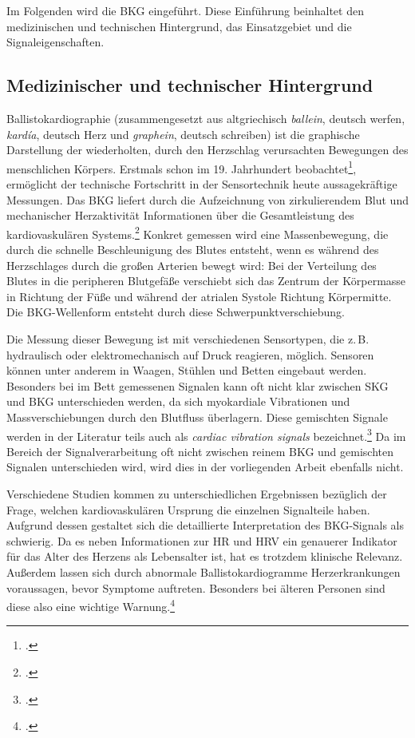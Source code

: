 	Im Folgenden wird die \acl{BKG} eingeführt. Diese Einführung beinhaltet den medizinischen und technischen Hintergrund, das Einsatzgebiet und die Signaleigenschaften.
	
	\subsection{Medizinischer und technischer Hintergrund}
	
	Ballistokardiographie (zusammengesetzt aus altgriechisch \textit{ballein}, deutsch \glq werfen\grq, \textit{kardía}, deutsch \glq Herz\grq{} und \textit{graphein}, deutsch \glq schreiben\grq) ist die graphische Darstellung der wiederholten, durch den Herzschlag verursachten Bewegungen des menschlichen Körpers. Erstmals schon im 19. Jahrhundert beobachtet\footcite[Vgl.][]{Gordon1877}, ermöglicht der technische Fortschritt in der Sensortechnik heute aussagekräftige Messungen. Das \ac{BKG} liefert durch die Aufzeichnung von zirkulierendem Blut und mechanischer Herzaktivität Informationen über die Gesamtleistung des kardiovaskulären Systems.\footcite[Vgl.][]{Pinheiro2010} Konkret gemessen wird eine Massenbewegung, die durch die schnelle Beschleunigung des Blutes entsteht, wenn es während des Herzschlages durch die großen Arterien bewegt wird: Bei der Verteilung des Blutes in die peripheren Blutgefäße verschiebt sich das Zentrum der Körpermasse in Richtung der Füße und während der atrialen Systole Richtung Körpermitte. Die \ac{BKG}-Wellenform entsteht durch diese Schwerpunktverschiebung.
	
	Die Messung dieser Bewegung ist mit verschiedenen Sensortypen, die z.\,B. hydraulisch oder elektromechanisch auf Druck reagieren, möglich. Sensoren können unter anderem in Waagen, Stühlen und Betten eingebaut werden. Besonders bei im Bett gemessenen Signalen kann oft nicht klar zwischen \ac{SKG} und \ac{BKG} unterschieden werden, da sich myokardiale Vibrationen und Massverschiebungen durch den Blutfluss überlagern. Diese gemischten Signale werden in der Literatur teils auch als \textit{cardiac vibration signals} bezeichnet.\footcite[Vgl.][]{Bruser2013} Da im Bereich der Signalverarbeitung oft nicht zwischen reinem \ac{BKG} und gemischten Signalen unterschieden wird, wird dies in der vorliegenden Arbeit ebenfalls nicht. %
	
	Verschiedene Studien kommen zu unterschiedlichen Ergebnissen bezüglich der Frage, welchen kardiovaskulären Ursprung die einzelnen Signalteile haben. Aufgrund dessen gestaltet sich die detaillierte Interpretation des \ac{BKG}-Signals als schwierig. Da es neben Informationen zur \ac{HR} und \ac{HRV} ein genauerer Indikator für das Alter des Herzens als Lebensalter ist, hat es trotzdem klinische Relevanz. Außerdem lassen sich durch abnormale Ballistokardiogramme Herzerkrankungen voraussagen, bevor Symptome auftreten. Besonders bei älteren Personen sind diese also eine wichtige Warnung.\footcite[Vgl. zu diesem Absatz][]{Pinheiro2010}
	
